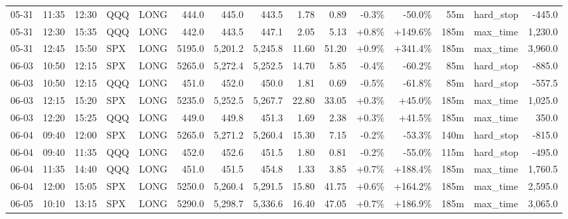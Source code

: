 \documentclass[11pt,a4paper,twoside]{article}
\begin{document}
\begin{landscape}
\begin{center}
\begin{longtable}{>{\color{txtmain}}l l l l l r r r r r r r r >{\color{txtmain}}l r}
05-31 & 11:35 & 12:30 & QQQ & LONG & 444.0 & 445.0 & 443.5 & 1.78 & 0.89 & \textcolor{lossred}{-0.3\%} & \textcolor{lossred}{-50.0\%} & 55m & hard\_stop & \textcolor{lossred}{-445.0} \\
05-31 & 12:30 & 15:35 & QQQ & LONG & 442.0 & 443.5 & 447.1 & 2.05 & 5.13 & \textcolor{wingreen}{+0.8\%} & \textcolor{wingreen}{+149.6\%} & 185m & max\_time & \textcolor{wingreen}{1,230.0} \\
05-31 & 12:45 & 15:50 & SPX & LONG & 5195.0 & 5,201.2 & 5,245.8 & 11.60 & 51.20 & \textcolor{wingreen}{+0.9\%} & \textcolor{wingreen}{+341.4\%} & 185m & max\_time & \textcolor{wingreen}{3,960.0} \\
06-03 & 10:50 & 12:15 & SPX & LONG & 5265.0 & 5,272.4 & 5,252.5 & 14.70 & 5.85 & \textcolor{lossred}{-0.4\%} & \textcolor{lossred}{-60.2\%} & 85m & hard\_stop & \textcolor{lossred}{-885.0} \\
06-03 & 10:50 & 12:15 & QQQ & LONG & 451.0 & 452.0 & 450.0 & 1.81 & 0.69 & \textcolor{lossred}{-0.5\%} & \textcolor{lossred}{-61.8\%} & 85m & hard\_stop & \textcolor{lossred}{-557.5} \\
06-03 & 12:15 & 15:20 & SPX & LONG & 5235.0 & 5,252.5 & 5,267.7 & 22.80 & 33.05 & \textcolor{wingreen}{+0.3\%} & \textcolor{wingreen}{+45.0\%} & 185m & max\_time & \textcolor{wingreen}{1,025.0} \\
06-03 & 12:20 & 15:25 & QQQ & LONG & 449.0 & 449.8 & 451.3 & 1.69 & 2.38 & \textcolor{wingreen}{+0.3\%} & \textcolor{wingreen}{+41.5\%} & 185m & max\_time & \textcolor{wingreen}{350.0} \\
06-04 & 09:40 & 12:00 & SPX & LONG & 5265.0 & 5,271.2 & 5,260.4 & 15.30 & 7.15 & \textcolor{lossred}{-0.2\%} & \textcolor{lossred}{-53.3\%} & 140m & hard\_stop & \textcolor{lossred}{-815.0} \\
06-04 & 09:40 & 11:35 & QQQ & LONG & 452.0 & 452.6 & 451.5 & 1.80 & 0.81 & \textcolor{lossred}{-0.2\%} & \textcolor{lossred}{-55.0\%} & 115m & hard\_stop & \textcolor{lossred}{-495.0} \\
06-04 & 11:35 & 14:40 & QQQ & LONG & 451.0 & 451.5 & 454.8 & 1.33 & 3.85 & \textcolor{wingreen}{+0.7\%} & \textcolor{wingreen}{+188.4\%} & 185m & max\_time & \textcolor{wingreen}{1,760.5} \\
06-04 & 12:00 & 15:05 & SPX & LONG & 5250.0 & 5,260.4 & 5,291.5 & 15.80 & 41.75 & \textcolor{wingreen}{+0.6\%} & \textcolor{wingreen}{+164.2\%} & 185m & max\_time & \textcolor{wingreen}{2,595.0} \\
06-05 & 10:10 & 13:15 & SPX & LONG & 5290.0 & 5,298.7 & 5,336.6 & 16.40 & 47.05 & \textcolor{wingreen}{+0.7\%} & \textcolor{wingreen}{+186.9\%} & 185m & max\_time & \textcolor{wingreen}{3,065.0} \\

\end{longtable}
\end{center}
\end{landscape}
\end{document}
